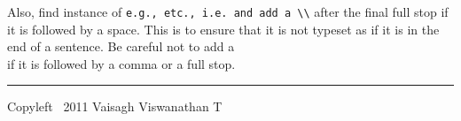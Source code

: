 \documentclass[12pt,landscape]{article}
\begin{document}
Also, find instance of \verb!e.g., etc., i.e. and add a \\! after the final full stop if it is followed by a space.
This is to ensure that it is not typeset as if it is in the end of a sentence. Be careful not to add a \\ if it is followed by a comma or a full stop.


\rule{0.3\linewidth}{0.25pt}
\scriptsize

Copyleft  \textcopyleft\ 2011 Vaisagh Viswanathan T
\end{document}
